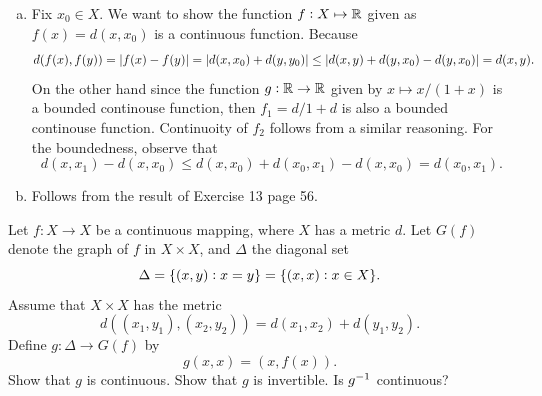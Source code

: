 \begin{solution}
	\begin{enumerate}[(a)]
		\item Fix $ x_0\in X $. We want to show the function $ f:X\mapsto \mathbb{R} $ given as $ f(x) = d(x,x_0) $ is a continuous function. Because
		\[ d(f(x),f(y)) = |f(x)-f(y)| = |d(x,x_0)+d(y,y_0)| \leq |d(x,y)+d(y,x_0)-d(y,x_0)| = d(x,y). \] 
		On the other hand since the function $ g:\mathbb{R}\to\mathbb{R} $ given by $ x\mapsto x/(1+x) $ is a bounded continouse function, then $f_1 =  d/1+d $ is also a bounded continouse function. Continuoity of $ f_2 $ follows from a similar reasoning. For the boundedness, observe that 
		\[ d(x,x_1) - d(x,x_0) \leq d(x,x_0) + d(x_0,x_1) - d(x,x_0) = d(x_0,x_1). \]
		
		\item Follows from the result of Exercise 13 page 56.
	\end{enumerate}
\end{solution}


\begin{problem}
	Let $ f: X \to X $ be a continuous mapping, where $ X $ has a metric $ d $. Let $ G(f) $ denote the graph of $ f $ in $ X\times X $, and $ \Delta $ the diagonal set
	\[ \Delta = \{(x,y): x=y\} = \{(x,x):x\in X\}. \]
	Assume that $ X\times X $ has the metric 
	\[ d((x_1,y_1),(x_2,y_2)) = d(x_1,x_2) + d(y_1,y_2). \]
	Define $ g: \Delta \to G(f) $ by
	\[ g(x,x) = (x,f(x)). \]
	Show that $ g $ is continuous. Show that $ g $ is invertible. Is $ g^{-1} $ continuous?
\end{problem}

